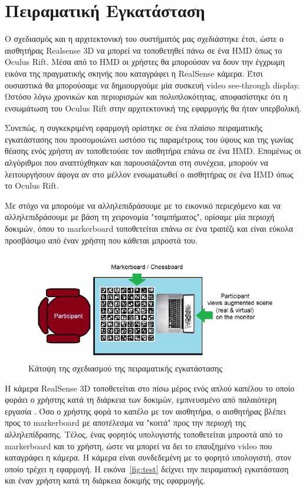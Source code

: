 \section{Πειραματική Εγκατάσταση}

Ο σχεδιασμός και η αρχιτεκτονική του συστήματός μας σχεδιάστηκε έτσι, ώστε ο αισθητήρας Realsense 3D να μπορεί να τοποθετηθεί πάνω σε ένα HMD όπως το Oculus Rift. Μέσα από το HMD οι χρήστες θα μπορούσαν να δουν την έγχρωμη εικόνα της πραγματικής σκηνής που καταγράφει η RealSense\texttrademark{} κάμερα. Έτσι ουσιαστικά θα μπορούσαμε να δημιουργούμε μία συσκευή video see-through display. Ωστόσο λόγω χρονικών και περιορισμών και πολυπλοκότητας, αποφασίστηκε ότι η ενσωμάτωση του Oculus Rift στην αρχιτεκτονική της εφαρμογής θα ήταν υπερβολική. 


Συνεπώς, η συγκεκριμένη εφαρμογή ορίστηκε σε ένα πλαίσιο πειραματικής εγκατάστασης που προσομοιώνει ωστόσο τις παραμέτρους του ύψους και της γωνίας θέασης ενός χρήστη αν τοποθετούσε τον αισθητήρα επάνω σε ένα HMD. Επομένως οι αλγόριθμοι που αναπτύχθηκαν και παρουσιάζονται στη συνέχεια, μπορούν να λειτουργήσουν άψογα αν στο μέλλον ενσωματωθεί ο αισθητήρας σε ένα HMD όπως το Oculus Rift. 


Με στόχο να μπορούμε να αλληλεπιδράσουμε με το εικονικό περιεχόμενο και να αλληλεπιδράσουμε με βάση τη χειρονομία "τσιμπήματος", ορίσαμε μία περιοχή δοκιμών, όπου το markerboard τοποθετείται επάνω σε ένα τραπέζι και είναι εύκολα προσβάσιμο από έναν χρήστη που κάθεται μπροστά του. 


\begin{figure}[H]
    \centering
    \includegraphics[scale=0.8, angle=0]{Files/Figures/planviewoftheexperimentalsetup.pdf}
    \caption[Κάτοψη της σχεδιασμού της πειραματικής εγκατάστασης]{Κάτοψη της σχεδιασμού της πειραματικής εγκατάστασης}
    \label{fig:plan_view}
\end{figure}


Η κάμερα RealSense\texttrademark{} 3D τοποθετείται στο πίσω μέρος ενός απλού καπέλου το οποίο φοράει ο χρήστης κατά τη διάρκεια των δοκιμών, εμπνευσμένο από παλαιότερη εργασία \cite{Mathews2007}. Όσο ο χρήστης φορά το καπέλο με τον αισθητήρα, ο αισθητήρας βλέπει προς το markerboard με αποτέλεσμα να "κοιτά" προς την περιοχή της αλληλεπίδρασης. Τέλος, ένας φορητός υπολογιστής τοποθετείται μπροστά από το markerboard και το χρήστη, ώστε να μπορεί να δει το επαυξημένο video που καταγράφει η κάμερα. Η κάμερα είναι συνδεδεμένη με το φορητό υπολογιστή, στον οποίο τρέχει η εφαρμογή. Η εικόνα~\ref{fig:test} δείχνει την πειραματική εγκατάσταση και έναν χρήστη κατά τη διάρκεια δοκιμής της εφαρμογής.



